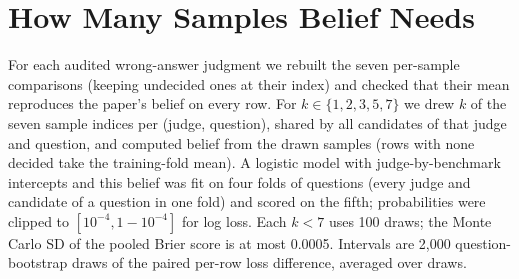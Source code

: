 \documentclass[11pt]{article}
\begin{document}
\section{How Many Samples Belief Needs}
\label{app:budget}
For each audited wrong-answer judgment we rebuilt the seven per-sample comparisons (keeping undecided ones at their
index) and checked that their mean reproduces the paper's belief on every row. For $k \in \{1, 2, 3, 5, 7\}$ we drew
$k$ of the seven sample indices per (judge, question), shared by all candidates of that judge and question, and
computed belief from the drawn samples (rows with none decided take the training-fold mean). A logistic model with
judge-by-benchmark intercepts and this belief was fit on four folds of questions (every judge and candidate of a
question in one fold) and scored on the fifth; probabilities were clipped to $[10^{-4}, 1-10^{-4}]$ for log loss.
Each $k<7$ uses 100 draws; the Monte Carlo SD of the pooled Brier score is at most 0.0005. Intervals are 2,000
question-bootstrap draws of the paired per-row loss difference, averaged over draws.

\begin{table}[h]
\centering
\small
{}
\caption{Held-out prediction of approval (4,883 audited wrong-answer judgments, 633 questions, approval rate 23\%).
Each step in $k$ (1$\to$2$\to$3$\to$5$\to$7) lowers held-out log loss with a paired interval excluding zero; the
last step is small (five to seven: Brier $-$0.0002, log loss $-$0.0005 [$-$0.0009, $-$0.0001]).}
\label{tab:budget}
\end{table}
\end{document}
